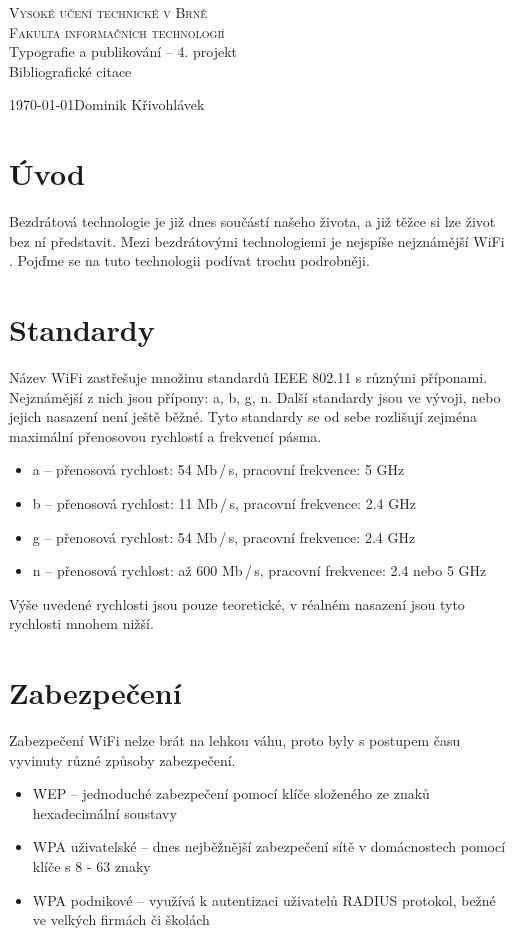 \documentclass[11pt, a4paper]{article}
\begin{document}
%
\begin{titlepage}
%
\begin{center}
%
\Huge
\textsc{Vysoké učení technické v Brně\\
\huge Fakulta informačních technologií\\}
%
%
{\LARGE
Typografie a publikování -- 4. projekt\\
\Huge Bibliografické citace\\}
%
%
\end{center}
{\Large \today \hfill Dominik Křivohlávek}
\medskip
\end{titlepage}
%
\section{Úvod}
Bezdrátová technologie je již dnes součástí našeho života, a již těžce si lze život bez ní představit.
Mezi bezdrátovými technologiemi je nejspíše nejznámější WiFi \cite{wifi_pruvodce}. Pojďme se na tuto technologii podívat trochu podrobněji.
%
\section{Standardy}
%
Název WiFi zastřešuje množinu standardů IEEE 802.11 s různými příponami.
Nejznámější z nich jsou přípony: a, b, g, n. Další standardy jsou ve vývoji, nebo jejich nasazení není ještě běžné.
Tyto standardy se od sebe rozlišují zejména maximální přenosovou rychlostí a frekvencí pásma.
\begin{itemize}
    \item a -- přenosová rychlost: 54 Mb\,/\,s, pracovní frekvence: 5 GHz
    \item b -- přenosová rychlost: 11 Mb\,/\,s, pracovní frekvence: 2.4 GHz
    \item g -- přenosová rychlost: 54 Mb\,/\,s, pracovní frekvence: 2.4 GHz
    \item n -- přenosová rychlost: až 600 Mb\,/\,s, pracovní frekvence: 2.4 nebo 5 GHz
\end{itemize}
Výše uvedené rychlosti jsou pouze teoretické, v réalném nasazení jsou tyto rychlosti \cite{rychlost} mnohem nižší.
%
\section{Zabezpečení}
Zabezpečení WiFi nelze brát na lehkou váhu, proto byly s postupem času vyvinuty různé způsoby zabezpečení.
\begin{itemize}
    \item WEP -- jednoduché zabezpečení pomocí klíče složeného ze znaků hexadecimální soustavy
    \item WPA uživatelské -- dnes nejběžnější zabezpečení sítě v domácnostech pomocí klíče s 8 - 63 znaky
    \item WPA podnikové -- využívá k autentizaci uživatelů RADIUS \cite{metody_autentizace} protokol, bežné ve velkých firmách či školách
\end{itemize}
%
\end{document}
